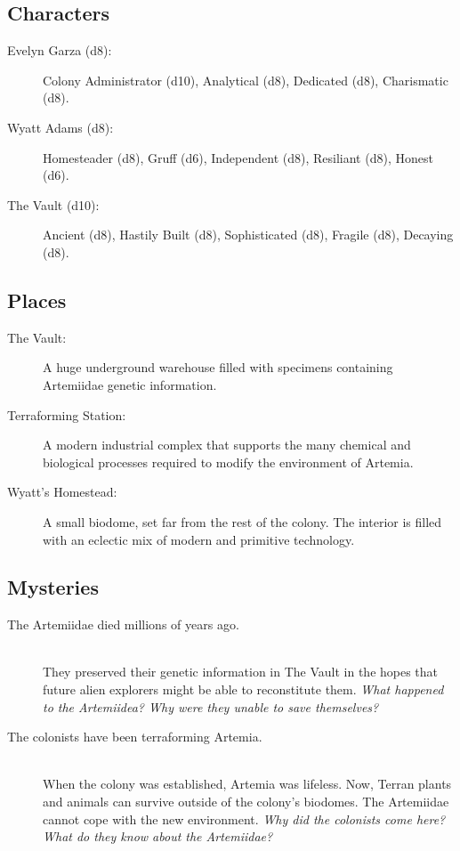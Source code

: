 \documentclass[11pt, a5paper, parskip=half-, DIV=12]{scrartcl}
\begin{document}
\newpage

\subsection*{Characters}
\begin{description}
	\item[Evelyn Garza (d8):] Colony Administrator (d10), Analytical (d8), Dedicated (d8), Charismatic (d8).
	\item[Wyatt Adams (d8):] Homesteader (d8), Gruff (d6), Independent (d8), Resiliant (d8), Honest (d6).
	\item[The Vault (d10):] Ancient (d8), Hastily Built (d8),  Sophisticated (d8), Fragile (d8), Decaying (d8).
\end{description}

\subsection*{Places}
\begin{description}
	\item[The Vault:] A huge underground warehouse filled with specimens containing Artemiidae genetic information.
	\item[Terraforming Station:] A modern industrial complex that supports the many chemical and biological processes required to modify the environment of Artemia.
	\item[Wyatt's Homestead:] A small biodome, set far from the rest of the colony. The interior is filled with an eclectic mix of modern and primitive technology.
\end{description}

\subsection*{Mysteries}
\begin{description}
	\item[The Artemiidae died millions of years ago.] \phantom{a} \\ They preserved their genetic information in The Vault in the hopes that future alien explorers might be able to reconstitute them. \textit{What happened to the Artemiidea? Why were they unable to save themselves?}
	\item[The colonists have been terraforming Artemia.] \phantom{a} \\ When the colony was established, Artemia was lifeless. Now, Terran plants and animals can survive outside of the colony's biodomes. The Artemiidae cannot cope with the new environment. \textit{Why did the colonists come here? What do they know about the Artemiidae?}
\end{description}
\end{document}
